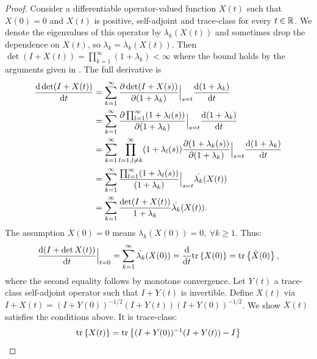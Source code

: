 \documentclass{amsart}
\numberwithin{equation}{section}
\providecommand{\DIFaddbegin}{} %
\providecommand{\DIFdelend}{} %
\begin{document}
\DIFdelend \DIFaddbegin \lax
\begin{proof}
  Consider a differentiable operator-valued function $X(t)$ such that
  $X(0) = 0$ and $X(t)$ is positive, self-adjoint and trace-class for
  every $t\in \mathbb{R}$. We denote the eigenvalues of this operator by
  $\lambda_k(X(t))$ and sometimes drop the dependence on $X(t)$, so
  $\lambda_k = \lambda_k(X(t))$.  Then $\det (I+X(t)) =
  \prod_{k=1}^{\infty} (1+\lambda_k) < \infty$ where the bound holds
  by the arguments given in \cite{AlexanderianGloorGhattas14}. The
  full derivative is
  \begin{align*}
    \frac{\text{\textup{d}} \det (I+X(t))}{\text{\textup{d}} t} 
    &= \sum_{k=1}^{\infty} 
    \frac{\partial \det (I+X(s))}{\partial (1+\lambda_k)}\Big |_{s=t}
    \frac{\text{\textup{d}} (1+\lambda_k)}{\text{\textup{d}} t} \\
    &= \sum_{k=1}^{\infty} \frac{\partial \prod_{l=1}^{\infty}
      (1+\lambda_l(s))}{\partial (1+\lambda_k)}\Big |_{s=t}
    \frac{\text{\textup{d}} (1+\lambda_k)}{\text{\textup{d}} t} \\
    &= \sum_{k=1}^{\infty} \prod_{l=1, l\neq k}^{\infty}
      (1+\lambda_l(s)) \frac{\partial (1+\lambda_k(s))}{\partial (1+\lambda_k)}\Big |_{s=t}
    \frac{\text{\textup{d}} (1+\lambda_k)}{\text{\textup{d}} t} \\
    &= \sum_{k=1}^{\infty} \frac{\prod_{l=1}^{\infty}
      (1+\lambda_l(s))}{(1+\lambda_k)}\Big |_{s=t}
    \dot{\lambda_k}(X(t)) \\
    &= \sum_{k=1}^{\infty} \frac{\det (I+X(t))}{1 +\lambda_k} \dot{\lambda_k}(X(t)).
  \end{align*}
  The assumption $X(0) = 0$ means $\lambda_k(X(0)) = 0,\ \forall k \geq 1$. Thus:
  \begin{align*}
    \frac{\text{\textup{d}} (I+\det X(t))}{\text{\textup{d}} t}\Big |_{t=0} 
    = \sum_{k=1}^{\infty} \dot{\lambda_k}(X(0)) 
    = \frac{\text{\textup{d}} }{\text{\textup{d}} t}\textup{tr}\left \{X(0) \right \}
    = \textup{tr}\left \{\dot{X}(0) \right \},
  \end{align*}
  where the second equality follows by monotone convergence. 
  Let $Y(t)$ a trace-class self-adjoint operator such that 
  $I+Y(t)$ is invertible.
  Define $X(t)$ via $I+X(t) = (I+Y(0))^{-1/2} (I+Y(t)) (I+Y(0))^{-1/2}$. 
  We show $X(t)$ satisfies the conditions above. It is trace-class:
  \begin{align*}
    \tr{X(t)} = \tr{(I+Y(0))^{-1} (I+Y(t)) - I}

\end{align*}
\end{proof}
\end{document}
